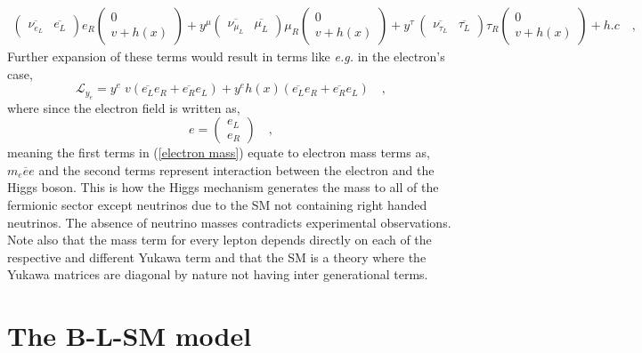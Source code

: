 \documentclass[12pt]{article}
\begin{document}
\begin{align}
\begin{pmatrix}
\overline{\nu_{e_L}} & \overline{e_L} 
\end{pmatrix} e_R 
\begin{pmatrix}
0 \\ v + h(x)
\end{pmatrix}  + y^\mu 
\begin{pmatrix}
\overline{\nu_{\mu_L}} & \overline{\mu_L} 
\end{pmatrix} \mu_R
\begin{pmatrix}
0 \\ v + h(x)
\end{pmatrix}  + y^\tau \
\begin{pmatrix}
\overline{\nu_{\tau_L}} & \overline{\tau_L} 
\end{pmatrix} \tau_R 
\begin{pmatrix}
0 \\ v + h(x)
\end{pmatrix} + h.c  \nonumber \quad , 
\end{align}
%
Further expansion of these terms would result in terms like \textit{e.g.} in the electron's case,  
%
\begin{equation}
\mathcal{L}_{y_e} = y^e \; v \left( \overline{e_L} e_R + \overline{e_R} e_L \right) +  y^e h(x) \left( \overline{e_L} e_R + \overline{e_R} e_L \right) \quad , 
\label{electron mass}
\end{equation}
%
where since the electron field is written as, 
% 
\begin{equation}
e=\begin{pmatrix}
e_L \\
e_R 
\end{pmatrix} \quad , 
\end{equation}
%
meaning the first terms in (\ref{electron mass}) equate to electron mass terms as, $m_e \overline{e} e $ and the second terms represent interaction between the electron and the Higgs boson.  
%
This is how the Higgs mechanism generates the mass to all of the fermionic sector except neutrinos due to the SM not containing right handed neutrinos. The absence of neutrino masses contradicts experimental observations.
%
Note also that the mass term for every lepton depends directly on each of the respective and different Yukawa term and that the SM is a theory where the Yukawa matrices are diagonal by nature not having inter generational terms.
 
\section{The B-L-SM model}
\end{document}
